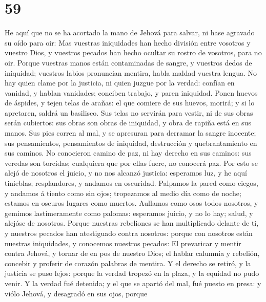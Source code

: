 \hypertarget{section-58}{%
\section{59}\label{section-58}}

 He aquí que no se ha acortado la mano de Jehová para
salvar, ni hase agravado su oído para oir:  Mas vuestras
iniquidades han hecho división entre vosotros y vuestro Dios, y vuestros
pecados han hecho ocultar su rostro de vosotros, para no oir.
 Porque vuestras manos están contaminadas de sangre, y
vuestros dedos de iniquidad; vuestros labios pronuncian mentira, habla
maldad vuestra lengua.  No hay quien clame por la
justicia, ni quien juzgue por la verdad: confían en vanidad, y hablan
vanidades; conciben trabajo, y paren iniquidad.  Ponen
huevos de áspides, y tejen telas de arañas: el que comiere de sus
huevos, morirá; y si lo apretaren, saldrá un basilisco. 
Sus telas no servirán para vestir, ni de sus obras serán cubiertos: sus
obras son obras de iniquidad, y obra de rapiña está en sus manos.
 Sus pies corren al mal, y se apresuran para derramar la
sangre inocente; sus pensamientos, pensamientos de iniquidad,
destrucción y quebrantamiento en sus caminos.  No
conocieron camino de paz, ni hay derecho en sus caminos: sus veredas son
torcidas; cualquiera que por ellas fuere, no conocerá paz.
 Por esto se alejó de nosotros el juicio, y no nos alcanzó
justicia: esperamos luz, y he aquí tinieblas; resplandores, y andamos en
oscuridad.  Palpamos la pared como ciegos, y andamos á
tiento como sin ojos; tropezamos al medio día como de noche; estamos en
oscuros lugares como muertos.  Aullamos como osos todos
nosotros, y gemimos lastimeramente como palomas: esperamos juicio, y no
lo hay; salud, y alejóse de nosotros.  Porque nuestras
rebeliones se han multiplicado delante de ti, y nuestros pecados han
atestiguado contra nosotros: porque con nosotros están nuestras
iniquidades, y conocemos nuestros pecados:  El prevaricar
y mentir contra Jehová, y tornar de en pos de nuestro Dios; el hablar
calumnia y rebelión, concebir y proferir de corazón palabras de mentira.
 Y el derecho se retiró, y la justicia se puso lejos:
porque la verdad tropezó en la plaza, y la equidad no pudo venir.
 Y la verdad fué detenida; y el que se apartó del mal,
fué puesto en presa: y viólo Jehová, y desagradó en sus ojos, porque
